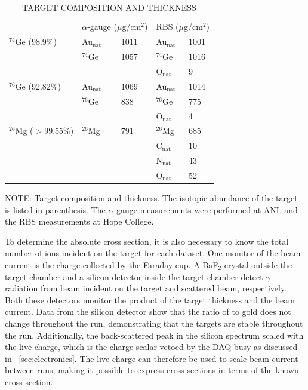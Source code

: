 \begin{table}[hp]
\centering
\caption[\uppercase{target composition and thickness}]{\\\uppercase{target composition and thickness}}
\label{tab:targets}
\begin{tabular}{lllll}\toprule
 & \multicolumn{2}{c}{$\alpha$-gauge ($\mu$g/cm$^2$)} & \multicolumn{2}{c}{RBS ($\mu$g/cm$^2$)} \\
\cmidrule(r){2-5}
$^{74}$Ge (98.9\%) & Au$_{\text{nat}}$ & 1011 & Au$_{\text{nat}}$ & 1001 \\
          & $^{74}$Ge & 1057 & $^{74}$Ge & 1016 \\
          &           &      & O$_{\text{nat}}$ & 9 \\[0.35cm]

$^{76}$Ge (92.82\%) & Au$_{\text{nat}}$ & 1069 & Au$_{\text{nat}}$ & 1014 \\
          & $^{76}$Ge & 838 & $^{76}$Ge & 775 \\
          &           &      & O$_{\text{nat}}$ & 4 \\[0.35cm]

$^{26}$Mg ($>$99.55\%) & $^{26}$Mg & 791 & $^{26}$Mg & 685 \\
          &           &      & C$_{\text{nat}}$ & 10 \\
          &           &      & N$_{\text{nat}}$ & 43 \\
          &           &      & O$_{\text{nat}}$ & 52 \\
\bottomrule
\end{tabular}
\begin{flushleft}
{\footnotesize NOTE:
Target composition and thickness.  The isotopic abundance of the target is listed in parenthesis.  The $\alpha$-gauge measurements were performed at ANL and the RBS measurements at Hope College.}
\end{flushleft}
\end{table}

To determine the absolute cross section, it is also necessary to know the total number of  ions incident on the target for each dataset.  One monitor of the beam current is the charge collected by the Faraday cup.  A BaF$_2$ crystal outside the target chamber and a silicon detector inside the target chamber detect $\gamma$ radiation from beam incident on the target and scattered  beam, respectively.  Both these detectors monitor the product of the target thickness and the beam current.  Data from the silicon detector show that the ratio of \GeTargets to gold does not change throughout the run, demonstrating that the targets are stable throughout the run.  Additionally, the back-scattered peak in the silicon spectrum scaled with the live charge, which is the charge scalar vetoed by the DAQ busy as discussed in {\sect}~\ref{sec:electronics}.  The live charge can therefore be used to scale beam current between runs, making it possible to express \reaction cross sections in terms of the known \MgReaction cross section.

